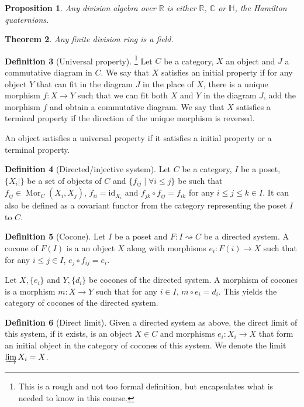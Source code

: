 \documentclass[paper=a4, fontsize=12pt]{scrartcl} %
\newtheorem{thm}{Theorem}
\newtheorem{prop}[thm]{Proposition}
\theoremstyle{definition}
\newtheorem{defn}[thm]{Definition}
\theoremstyle{remark}
\newcommand{\R}{\mathbb{R}}
\newcommand{\C}{\mathbb{C}}
\DeclareMathOperator{\Mor}{Mor}
\begin{document}
\begin{prop}
	Any division algebra over $\R$ is either $\R$, $\C$ or $\mathbb{H}$, the Hamilton quaternions.
\end{prop}
\begin{thm}
	Any finite division ring is a field.
\end{thm}
\begin{defn}[Universal property]\footnote{This is a rough and not too formal definition, but encapsulates what is needed to know in this course.}
	Let $C$ be a category, $X$ an object and $J$ a commutative diagram in $C$. We say that $X$ satisfies an initial property if for any object $Y$ that can fit in the diagram $J$ in the place of $X$, there is a unique morphism $f: X\rightarrow Y$ such that we can fit both $X$ and $Y$ in the diagram $J$, add the morphism $f$ and obtain a commutative diagram. We say that $X$ satisfies a terminal property if the direction of the unique morphism is reversed.
	
	An object satisfies a universal property if it satisfies a initial property or a terminal property.
\end{defn}
\begin{defn}[Directed/injective system]
	Let $C$ be a category, $I$ be a poset, $\{X_i\mid \}$ be a set of objects of $C$ and $\{f_{ij} \mid \forall i\leq j\}$ be such that $f_{ij} \in \Mor_C(X_i, X_j)$, $f_{ii} = \text{id}_{X_i}$ and $f_{jk} \circ f_{ij} = f_{ik}$ for any $i\leq j\leq k \in I$. It can also be defined as a covariant functor from the category representing the poset $I$ to $C$.
\end{defn}
\begin{defn}[Cocone]
	Let $I$ be a poset and $F:I\rightsquigarrow C$ be a directed system. A cocone of $F(I)$ is a an object $X$ along with morphisms $e_i: F(i) \rightarrow X$ such that for any $i\leq j \in I$, $e_j \circ f_{ij} = e_i$.
	
	Let $X, \{e_i\}$ and $Y, \{d_i\}$ be cocones of the directed system. A morphism of cocones is a morphism $m : X \rightarrow Y$ such that for any $i \in I$, $m \circ e_i = d_i$. This yields the category of cocones of the directed system.
\end{defn}
\begin{defn}[Direct limit]
	Given a directed system as above, the direct limit of this system, if it exists, is an object $X \in C$ and morphisms $e_i: X_i \rightarrow X$ that form an initial object in the category of cocones of this system. We denote the limit $\varinjlim X_i = X$.
\end{defn}
\end{document}
